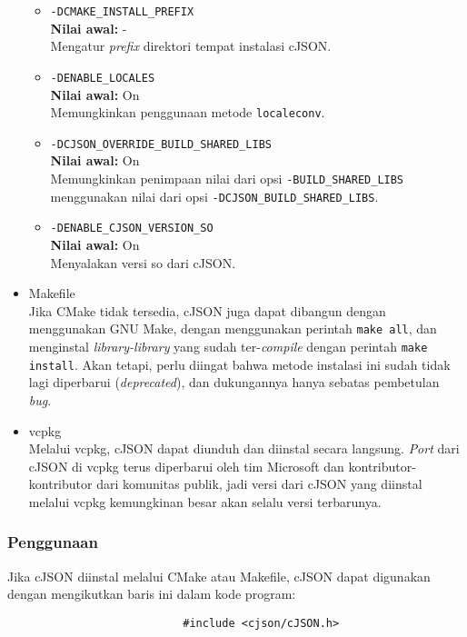 \begin{itemize}
\begin{itemize}
		\item \verb|-DCMAKE_INSTALL_PREFIX|\\
		\textbf{Nilai awal:} -\\
		Mengatur \textit{prefix} direktori tempat instalasi cJSON.
		\item \verb|-DENABLE_LOCALES|\\
		\textbf{Nilai awal:} On\\
		Memungkinkan penggunaan metode \verb|localeconv|.
		\item \verb|-DCJSON_OVERRIDE_BUILD_SHARED_LIBS|\\
		\textbf{Nilai awal:} On\\
		Memungkinkan penimpaan nilai dari opsi \verb|-BUILD_SHARED_LIBS| menggunakan nilai dari opsi \verb|-DCJSON_BUILD_SHARED_LIBS|.
		\item \verb|-DENABLE_CJSON_VERSION_SO|\\
		\textbf{Nilai awal:} On\\
		Menyalakan versi so dari cJSON.
	\end{itemize}

	\item Makefile\\
	Jika CMake tidak tersedia, cJSON juga dapat dibangun dengan menggunakan GNU Make, dengan menggunakan perintah \verb|make all|, dan menginstal \textit{library-library} yang sudah ter-\textit{compile} dengan perintah \verb|make install|. Akan tetapi, perlu diingat bahwa metode instalasi ini sudah tidak lagi diperbarui (\textit{deprecated}), dan dukungannya hanya sebatas pembetulan \textit{bug}.
	
	\item vcpkg\\
	Melalui vcpkg, cJSON dapat diunduh dan diinstal secara langsung. \textit{Port} dari cJSON di vcpkg terus diperbarui oleh tim Microsoft dan kontributor-kontributor dari komunitas publik, jadi versi dari cJSON yang diinstal melalui vcpkg kemungkinan besar akan selalu versi terbarunya.
\end{itemize}

\subsubsection{Penggunaan}
\label{sec:cmodules-cJSON-usage}

Jika cJSON diinstal melalui CMake atau Makefile, cJSON dapat digunakan dengan mengikutkan baris ini dalam kode program:

\begin{verbatim}
                           #include <cjson/cJSON.h>
\end{verbatim}

